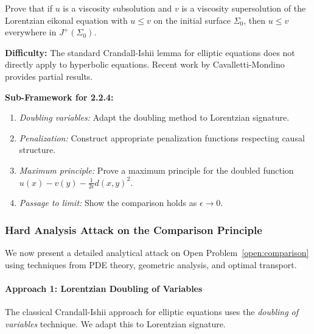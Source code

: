 \begin{openproblem}\label{open:comparison}
Prove that if $u$ is a viscosity subsolution and $v$ is a viscosity supersolution of the Lorentzian eikonal equation with $u \leq v$ on the initial surface $\Sigma_0$, then $u \leq v$ everywhere in $J^+(\Sigma_0)$.
\end{openproblem}

\textbf{Difficulty:} The standard Crandall-Ishii lemma for elliptic equations does not directly apply to hyperbolic equations. Recent work by Cavalletti-Mondino provides partial results.

\textbf{Sub-Framework for 2.2.4:}
\begin{enumerate}
    \item[(2.2.4a)] \textit{Doubling variables:} Adapt the doubling method to Lorentzian signature.
    \item[(2.2.4b)] \textit{Penalization:} Construct appropriate penalization functions respecting causal structure.
    \item[(2.2.4c)] \textit{Maximum principle:} Prove a maximum principle for the doubled function $u(x) - v(y) - \frac{1}{2\epsilon}d(x,y)^2$.
    \item[(2.2.4d)] \textit{Passage to limit:} Show the comparison holds as $\epsilon \to 0$.
\end{enumerate}

\subsubsection{Hard Analysis Attack on the Comparison Principle}\label{subsec:HardAnalysis}

We now present a detailed analytical attack on Open Problem~\ref{open:comparison} using techniques from PDE theory, geometric analysis, and optimal transport.

\paragraph{Approach 1: Lorentzian Doubling of Variables}

The classical Crandall-Ishii approach for elliptic equations uses the \textit{doubling of variables} technique. We adapt this to Lorentzian signature.

